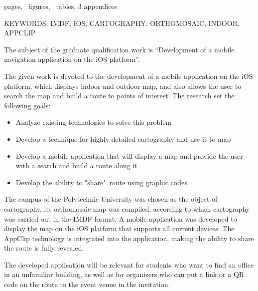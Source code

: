 \noindent \pageref{LastPage} pages, \totalfigures\ figures, \totaltables\ tables, 3 appendices

\MakeUppercase{
  keywords: imdf, ios, cartography, orthomosaic, indoor, appclip
}

The subject of the graduate qualification work is ``Development of a mobile navigation application on the iOS platform''.

The given work is devoted to the development of a mobile application on the iOS platform, which displays indoor and outdoor map, and also allows the user to search the map and build a route to points of interest.
The research set the following goals:
\begin{itemize}
  \item Analyze existing technologies to solve this problem
  \item Develop a technique for highly detailed cartography and use it to map
  \item Develop a mobile application that will display a map and provide the user with a search and build a route along it
  \item Develop the ability to "share"\ route using graphic codes
\end{itemize}

The campus of the Polytechnic University was chosen as the object of cartography, its orthomosaic map was compiled, according to which cartography was carried out in the IMDF format. A mobile application was developed to display the map on the iOS platform that supports all current devices. The AppClip technology is integrated into the application, making the ability to share the route is fully revealed.

The developed application will be relevant for students who want to find an office in an unfamiliar building, as well as for organizers who can put a link or a QR code on the route to the event venue in the invitation.
